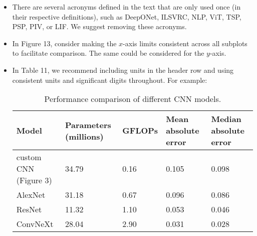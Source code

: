\documentclass[11pt]{article}
\begin{document}
\begin{itemize}
  \item There are several acronyms defined in the text that are only used once (in their respective definitions), such as DeepONet, ILSVRC, NLP, ViT, TSP, PSP, PIV, or LIF. We suggest removing these acronyms.

  \item In Figure 13, consider making the $x$-axis limits consistent across all subplots to facilitate comparison. The same could be considered for the $y$-axis.

  \item In Table 11, we recommend including units in the header row and using consistent units and significant digits throughout. For example:
  
  \begin{table}[ht]
    \centering
    \begin{tabular}{C{4cm} C{2.4cm} C{1.7cm} C{2.75cm} C{2.75cm}}
      \toprule
      \textbf{Model} & 
      \textbf{Parameters (millions)} & 
      \textbf{GFLOPs} & 
      \textbf{Mean absolute error} & 
      \textbf{Median absolute error} \\
      \midrule
      custom CNN (Figure 3) & 34.79 & 0.16 & 0.105 & 0.098 \\
      AlexNet               & 31.18 & 0.67 & 0.096 & 0.086 \\
      ResNet                & 11.32 & 1.10 & 0.053 & 0.046 \\
      ConvNeXt              & 28.04 & 2.90 & 0.031 & 0.028 \\
      \bottomrule
    \end{tabular}
    \caption{Performance comparison of different CNN models.}
  \end{table}

\end{itemize}
\end{document}
